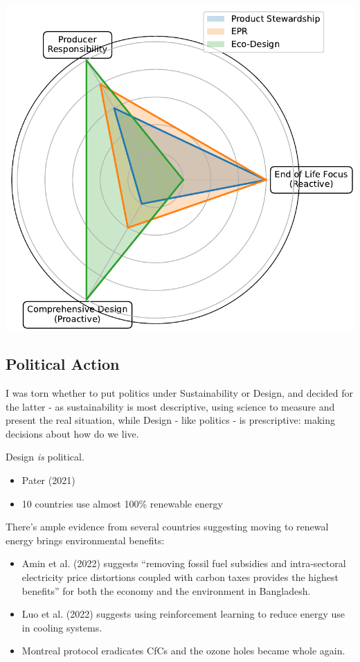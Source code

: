 \documentclass[
  letterpaper,
  DIV=11,
  numbers=noendperiod]{scrartcl}
\providecommand{\tightlist}{%
  \setlength{\itemsep}{0pt}\setlength{\parskip}{0pt}}\usepackage{longtable,booktabs,array}
\begin{document}
\includegraphics{_thesis_files/figure-pdf/cell-24-output-1.pdf}

\subsection{Political Action}\label{political-action}

I was torn whether to put politics under Sustainability or Design, and
decided for the latter - as sustainability is most descriptive, using
science to measure and present the real situation, while Design - like
politics - is prescriptive: making decisions about how do we live.

Design \emph{is} political.

\begin{itemize}
\tightlist
\item
  Pater (2021)
\item
  10 countries use almost 100\% renewable energy
\end{itemize}

There's ample evidence from several countries suggesting moving to
renewal energy brings environmental benefits:

\begin{itemize}
\item
  Amin et al. (2022) suggests ``removing fossil fuel subsidies and
  intra-sectoral electricity price distortions coupled with carbon taxes
  provides the highest benefits'' for both the economy and the
  environment in Bangladesh.
\item
  Luo et al. (2022) suggests using reinforcement learning to reduce
  energy use in cooling systems.
\item
  Montreal protocol eradicates CfCs and the ozone holes became whole
  again.
\end{itemize}
\end{document}
